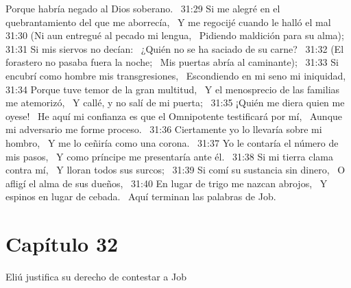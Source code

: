 Porque habría negado al Dios soberano.  
31:29 Si me alegré en el quebrantamiento del que me aborrecía,  
Y me regocijé cuando le halló el mal  
31:30 (Ni aun entregué al pecado mi lengua,  
Pidiendo maldición para su alma);  
31:31 Si mis siervos no decían:  
¿Quién no se ha saciado de su carne?  
31:32 (El forastero no pasaba fuera la noche;  
Mis puertas abría al caminante);  
31:33 Si encubrí como hombre mis transgresiones,  
Escondiendo en mi seno mi iniquidad,  
31:34 Porque tuve temor de la gran multitud,  
Y el menosprecio de las familias me atemorizó,  
Y callé, y no salí de mi puerta;  
31:35 ¡Quién me diera quien me oyese!  
He aquí mi confianza es que el Omnipotente testificará por mí,  
Aunque mi adversario me forme proceso.  
31:36 Ciertamente yo lo llevaría sobre mi hombro,  
Y me lo ceñiría como una corona.  
31:37 Yo le contaría el número de mis pasos,  
Y como príncipe me presentaría ante él.  
31:38 Si mi tierra clama contra mí,  
Y lloran todos sus surcos;  
31:39 Si comí su sustancia sin dinero,  
O afligí el alma de sus dueños,  
31:40 En lugar de trigo me nazcan abrojos,  
Y espinos en lugar de cebada.  
Aquí terminan las palabras de Job.  
\section*{Capítulo 32 }
Eliú justifica su derecho de contestar a Job  

